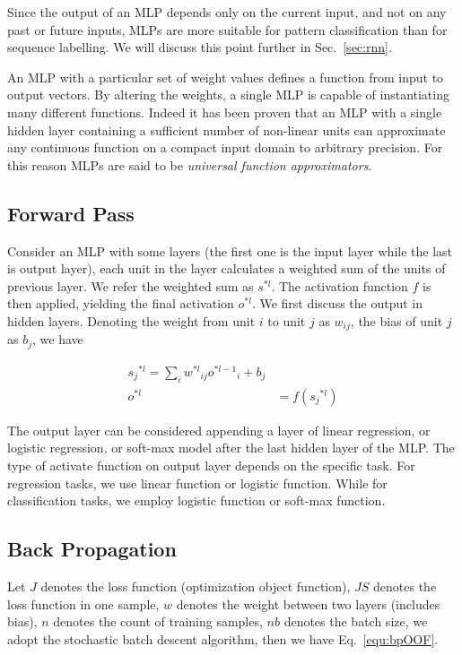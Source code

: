 \documentclass[runningheads,openany]{xhlPaper}
\begin{document}
Since the output of an MLP depends only on the current input, and not on any past or future inputs, MLPs are more suitable for pattern classification than for sequence labelling. We will discuss this point further in Sec.~\ref{sec:rnn}.

An MLP with a particular set of weight values defines a function from input to output vectors.
By altering the weights, a single MLP is capable of instantiating many different functions.
Indeed it has been proven \cite{Hornik_Universal_Function_1989} that an MLP with a single hidden layer containing a sufficient number of non-linear units can approximate any continuous function on a compact input domain to arbitrary precision.
For this reason MLPs are said to be \emph{universal function approximators}.

\subsection{Forward Pass}
Consider an MLP with some layers (the first one is the input layer while the last is output layer), each unit in the layer calculates a weighted sum of the units of previous layer. We refer the weighted sum as $s^{*l}$.
The activation function $f$ is then applied, yielding the final activation $o^{*l}$. 
We first discuss the output in hidden layers.
Denoting the weight from unit $i$ to unit $j$ as $w_{ij}$, the bias of unit $j$ as $b_{j}$, we have

\begin{equation}
\label{equ:mlp_forward_output}
\begin{aligned}
{s_j}^{*l} = \sum\limits_i {{w^{*l}}_{ij}{o^{*l - 1}}_i}  + {b_j}\\
{o^{*l}} &= f\left( {{s_j}^{*l}} \right)
\end{aligned}
\end{equation}

The output layer can be considered appending a layer of linear regression, or logistic regression, or soft-max model after the last hidden layer of the MLP.
The type of activate function on output layer depends on the specific task. For regression tasks, we use linear function or logistic function. While for classification tasks, we employ logistic function or soft-max function. 

\subsection{Back Propagation}
Let $J$ denotes the loss function (optimization object function), $JS$ denotes the loss function in one sample, $w$ denotes the weight between two layers (includes bias), $n$ denotes the count of training samples, $nb$ denotes the batch size, we adopt the stochastic batch descent algorithm, then we have Eq.~\ref{equ:bpOOF}.
\end{document}
